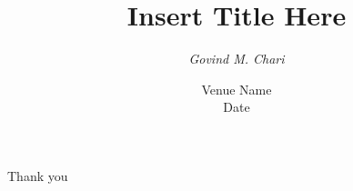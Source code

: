 \documentclass[aspectratio=169,11pt]{beamer}
\title{\textbf{Insert Title Here}}
\author{{\normalsize \texorpdfstring{\textit{Govind M. Chari}}{Govind M. Chari}}}
\date{{\small Venue Name}\\[0.2cm]{\small Date}}
\begin{document}
\begingroup
{}
\begin{frame}
\titlepage
\end{frame}
\endgroup

\begin{frame}
    \begin{center}
    
        Thank you 
    
        \vspace{1.5cm}
    
        {\footnotesize{}}
    \end{center}
\end{frame}
\end{document}
